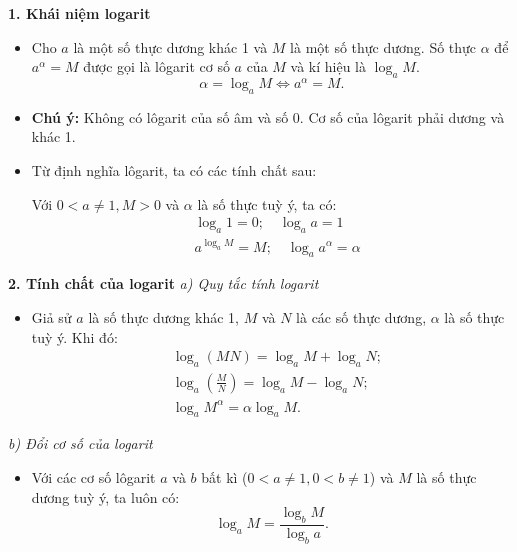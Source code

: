 \documentclass[12pt,a4paper]{extarticle}
\begin{document}
\onehalfspacing

\makeheadbox[headerright={Tổng ôn 10-11},chude={CHỦ ĐỀ 09},tieude={logarit và luỹ thừa},dinhdang={Giải tích},lop={12 },gv={Nguyễn Lê Minh Ngọc}]

\vspace{2em}

\noindent\textbf{1. Khái niệm logarit}
\begin{itemize}
    \item Cho $a$ là một số thực dương khác 1 và $M$ là một số thực dương. Số thực $\alpha$ để $a^\alpha = M$ được gọi là lôgarit cơ số $a$ của $M$ và kí hiệu là $\log_a M$.
    \[ \alpha = \log_a M \Leftrightarrow a^\alpha = M. \]
    \item \textbf{Chú ý:} Không có lôgarit của số âm và số 0. Cơ số của lôgarit phải dương và khác 1.
    \item Từ định nghĩa lôgarit, ta có các tính chất sau:
    
    Với $0 < a \ne 1, M > 0$ và $\alpha$ là số thực tuỳ ý, ta có:
    \begin{align*}
        &\log_a 1 = 0; \quad \log_a a = 1 \\
        &a^{\log_a M} = M; \quad \log_a a^\alpha = \alpha
    \end{align*}
\end{itemize}

\vspace{0.4cm}
\noindent\textbf{2. Tính chất của logarit}
\noindent\textit{a) Quy tắc tính logarit}
\begin{itemize}
    \item Giả sử $a$ là số thực dương khác 1, $M$ và $N$ là các số thực dương, $\alpha$ là số thực tuỳ ý. Khi đó:
    \begin{align*}
        &\log_a(MN) = \log_a M + \log_a N; \\
        &\log_a\left(\frac{M}{N}\right) = \log_a M - \log_a N; \\
        &\log_a M^\alpha = \alpha \log_a M.
    \end{align*}
\end{itemize}

\vspace{0.4cm}
\noindent\textit{b) Đổi cơ số của logarit}
\begin{itemize}
    \item Với các cơ số lôgarit $a$ và $b$ bất kì ($0 < a \ne 1, 0 < b \ne 1$) và $M$ là số thực dương tuỳ ý, ta luôn có:
    \[ \log_a M = \frac{\log_b M}{\log_b a}. \]
\end{itemize}
\end{document}
